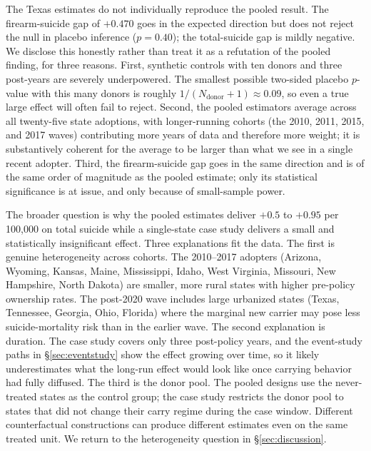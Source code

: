 \documentclass[12pt]{article}
\begin{document}
The Texas estimates do not individually reproduce the pooled
result. The firearm-suicide gap of $+0.470$ goes in the expected
direction but does not reject the null in placebo inference
($p = 0.40$); the total-suicide gap is mildly negative. We disclose
this honestly rather than treat it as a refutation of the pooled
finding, for three reasons. First, synthetic controls with ten
donors and three post-years are severely underpowered. The smallest
possible two-sided placebo $p$-value with this many donors is
roughly $1/(N_{\text{donor}} + 1) \approx 0.09$, so even a true
large effect will often fail to reject. Second, the pooled
estimators average across all twenty-five state adoptions, with
longer-running cohorts (the 2010, 2011, 2015, and 2017 waves)
contributing more years of data and therefore more weight; it is
substantively coherent for the average to be larger than what we
see in a single recent adopter. Third, the firearm-suicide gap
goes in the same direction and is of the same order of magnitude
as the pooled estimate; only its statistical significance is at
issue, and only because of small-sample power.

The broader question is why the pooled estimates deliver $+0.5$
to $+0.95$ per 100,000 on total suicide while a single-state case
study delivers a small and statistically insignificant effect.
Three explanations fit the data. The first is genuine
heterogeneity across cohorts. The 2010--2017 adopters (Arizona,
Wyoming, Kansas, Maine, Mississippi, Idaho, West Virginia,
Missouri, New Hampshire, North Dakota) are smaller, more rural
states with higher pre-policy ownership rates. The post-2020 wave
includes large urbanized states (Texas, Tennessee, Georgia, Ohio,
Florida) where the marginal new carrier may pose less
suicide-mortality risk than in the earlier wave. The second
explanation is duration. The case study covers only three
post-policy years, and the event-study paths in
§\ref{sec:eventstudy} show the effect growing over time, so it
likely underestimates what the long-run effect would look like
once carrying behavior had fully diffused. The third is the donor
pool. The pooled designs use the never-treated states as the
control group; the case study restricts the donor pool to states
that did not change their carry regime during the case window.
Different counterfactual constructions can produce different
estimates even on the same treated unit. We return to the
heterogeneity question in §\ref{sec:discussion}.

\end{document}
